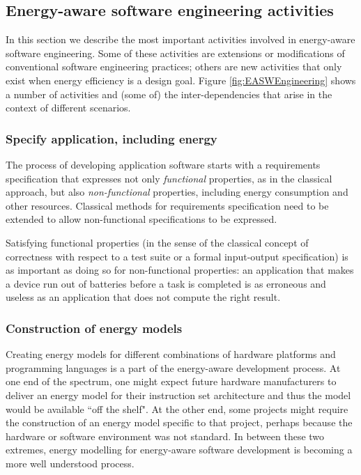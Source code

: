 \documentclass[11pt,oneside]{book}
\begin{document}
\subsection{Energy-aware software engineering activities}\label{sweng-activities}

In this section we describe the most important activities involved in
energy-aware software engineering.  Some of these activities are
extensions or modifications of conventional software engineering
practices; others are new activities that only exist when energy
efficiency is a design goal.  Figure \ref{fig:EASWEngineering} shows a
number of activities and (some of) the inter-dependencies that arise
in the context of different scenarios.

\subsubsection{Specify application, including energy}
The process of developing application software starts with a
requirements specification that expresses not only \emph{functional} properties, as
in the classical approach, but also \emph{non-functional} properties,
including energy consumption and other resources.  Classical
methods for requirements specification need to be extended to allow
non-functional specifications to be expressed. 

Satisfying
functional properties (in the sense of the classical concept of
correctness with respect to a test suite or a formal input-output
specification) is as important as doing so for non-functional
properties: an application that makes a device run out of batteries
before a task is completed is as erroneous and useless as an
application that does not compute the right result. 

\subsubsection{Construction of energy models}\label{energy-models}

Creating energy models for different combinations of hardware platforms and programming 
languages is a part of the energy-aware development process.  At one end of the 
spectrum,  one might
expect future hardware manufacturers to deliver an energy model for their instruction set architecture 
and thus the model would be available ``off the shelf".  At the other end, some
projects might require the construction of an energy model specific to that project, perhaps
because the hardware or software environment was not standard.  In between these two
extremes, energy modelling  for energy-aware software development is becoming a more
well understood process.
\end{document}
